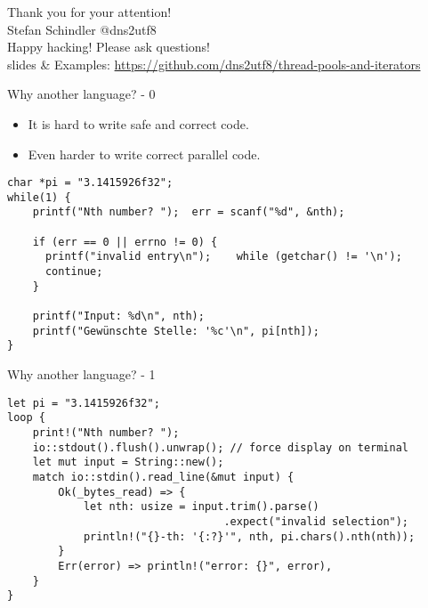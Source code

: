 \documentclass[aspectratio=1610,t]{beamer}
\begin{document}



{
\begin{frame}[standout]
	\begin{centering}
	{\Huge Thank you for your attention!}\\
	{\normalsize Stefan Schindler @dns2utf8 }\\
  {\normalsize Happy hacking! Please ask questions! }\\
	{\footnotesize slides \& Examples: \url{https://github.com/dns2utf8/thread-pools-and-iterators}}\\
	\end{centering}
\end{frame}
}




\begin{frame}[fragile]{Why another language? - 0}
  \begin{itemize}
    \item It is hard to write safe and correct code.
    \item Even harder to write correct parallel code.
  \end{itemize}

\begin{verbatim}
char *pi = "3.1415926f32";
while(1) {
    printf("Nth number? ");  err = scanf("%d", &nth);

    if (err == 0 || errno != 0) {
      printf("invalid entry\n");    while (getchar() != '\n');
      continue;
    }

    printf("Input: %d\n", nth);
    printf("Gewünschte Stelle: '%c'\n", pi[nth]);
}
\end{verbatim}
\end{frame}


\begin{frame}[fragile]{Why another language? - 1}
\begin{verbatim}
let pi = "3.1415926f32";
loop {
    print!("Nth number? ");
    io::stdout().flush().unwrap(); // force display on terminal
    let mut input = String::new();
    match io::stdin().read_line(&mut input) {
        Ok(_bytes_read) => {
            let nth: usize = input.trim().parse()
                                  .expect("invalid selection");
            println!("{}-th: '{:?}'", nth, pi.chars().nth(nth));
        }
        Err(error) => println!("error: {}", error),
    }
}
\end{verbatim}
\end{frame}
\end{document}
